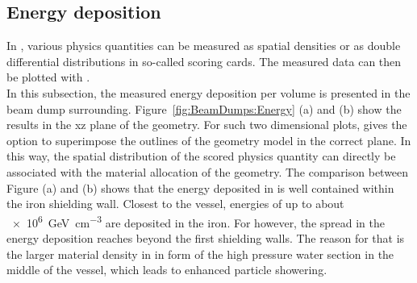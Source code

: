 \subsection{Energy deposition}
\label{BeamDumps:sim_surrounding:Energy}
In \fluka, various physics quantities can be measured as spatial densities or as double differential distributions in so-called scoring cards.
The measured data can then be plotted with \flair.
\\In this subsection, the measured energy deposition per volume is presented in the beam dump surrounding.
Figure~\ref{fig:BeamDumps:Energy} (a) and (b) show the results in the xz plane of the geometry.
For such two dimensional plots, \flair gives the option to superimpose the outlines of the geometry model in the correct plane.
In this way, the spatial distribution of the scored physics quantity can directly be associated with the material allocation of the geometry.
The comparison between Figure (a) and (b) shows that the energy deposited in \designone is well contained within the iron shielding wall.
Closest to the vessel, energies of up to about \SI{e6}{\GeV\per\centi\meter\cubed} are deposited in the iron.
For \designtwo however, the spread in the energy deposition reaches beyond the first shielding walls.
The reason for that is the larger material density in \designtwo in form of the high pressure water section in the middle of the vessel, which leads to enhanced particle showering.
